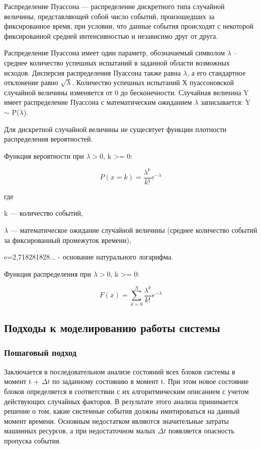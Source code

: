 \documentclass[14pt, a4paper]{extarticle}
\begin{document}
Распределение Пуассона — распределение дискретного типа случайной величины, представляющей собой число событий, произошедших за фиксированное время, при условии, что данные события происходят с некоторой фиксированной средней интенсивностью и независимо друг от друга.

Распределение Пуассона имеет один параметр, обозначаемый символом $\lambda$ – среднее количество успешных испытаний в заданной области возможных исходов. Дисперсия распределения Пуассона также равна $\lambda$, а его стандартное отклонение равно $\sqrt{\lambda}$. Количество успешных испытаний Х пуассоновской случайной величины изменяется от 0 до бесконечности. Случайная величина Y имеет распределение Пуассона с математическим ожиданием $\lambda$ записывается: Y $\sim$ P($\lambda$).

Для дискретной случайной величины не сущесвтует функции плотности распределения вероятностей. 

Функция вероятности при $\lambda > 0$, k >= 0:

\begin{equation}
	P(x = k)=\frac{\lambda^{k}}{k!} e^{-\lambda}
\end{equation}

где

k — количество событий,

$\lambda$  — математическое ожидание случайной величины (среднее количество событий за фиксированный промежуток времени),

e=2,718281828... - основание натурального логарифма.

Функция распределения при $\lambda > 0$, k >= 0:

\begin{equation}
F(x) = \sum_{k=0}^{N}\frac{\lambda^{k}}{k!} e^{-\lambda}
\end{equation}

\subsection{Подходы к моделированию работы системы}

\subsubsection{Пошаговый подход}

Заключается в последовательном анализе состояний всех блоков системы в момент t + $\Delta t$ по заданному состоянию в момент t.  При этом новое состояние блоков определяется в соответствии с их алгоритмическим описанием с учетом действующих случайных факторов. В результате этого анализа принимается решение о том, какие системные события должны имитироваться на данный момент времени. Основным недостатком являются значительные затраты машинных ресурсов, а при недостаточном малых $\Delta t$ появляется опасность пропуска события. 
\end{document}
